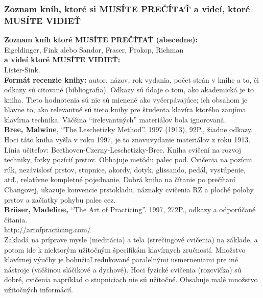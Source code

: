 \subsubsection*{Zoznam kníh, ktoré si MUSÍTE PREČÍTAŤ a videí, ktoré MUSÍTE VIDIEŤ}

\textbf{Zoznam kníh ktoré MUSÍTE PREČÍTAŤ (abecedne):}\\
Eigeldinger, Fink alebo Sandor, Fraser, Prokop, Richman\\
\textbf{a videí ktoré MUSÍTE VIDIEŤ:}\\
Lister-Sink.
\medskip\\
\textbf{Formát recenzie knihy:} autor, názov, rok vydania, počet strán v knihe a to, či odkazy sú citované (bibliografia). Odkazy sú údaje o tom, ako akademická je to kniha. Tieto hodnotenia sú nie sú mienené ako vyčerpávajúce; ich obsahom je hlavne to, ako relevantné sú tieto knihy pre študenta klavíra ktorého zaujíma klavírna technika. Väčšina “irelevantných” materiálov bola ignorovaná.
\medskip\\
\textbf{Bree, Malwine}, “The Leschetizky Method”. 1997 (1913), 92P., žiadne odkazy. Hoci táto kniha vyšla v roku 1997, je to znovuvydanie materiálov z roku 1913.\\
Línia učiteľov: Beethoven-Czerny-Leschetizky-Bree. Kniha cvičení na rozvoj techniky, fotky pozícií prstov. Obhajuje metódu palec pod. Cvičenia na pozíciu rúk, nezávislosť prstov, stupnice, akordy, dotyk, glissando, pedál, vystúpenie, atď., relatívne kompletné pojednanie. Dobrá kniha na čítanie po prečítaní Changovej, ukazuje konvencie prstokladu, náznaky cvičenia RZ a ploché polohy prstov a začiatky pohybu palec cez. 
\medskip\\
\textbf{Brüser}\textbf{, }\textbf{Madeline}\textbf{,} “The Art of Practicing”. 1997, 272P., odkazy a odporúčané čítania.\\\href{http://artofpracticing.com/}{http://artofpracticing.com/}\\ Zakladá na príprave mysle (meditácia) a tela (strečingové cvičenia) na základe, a potom ide k niektorým užitočným špecifikám klavírnych zručností. Množstvo klavírnej výučby je bohužiaľ redukované paralelnými  usmerneniami pre iné nástroje (väčšinou sláčikové a dychové). Hoci fyzické cvičenia (rozcvička) sú dobré, cvičenia napríklad o stupniciach nie sú užitočné. Obsahuje malé množstvo užitočných informácií.
\medskip\\
